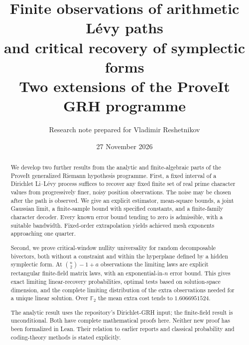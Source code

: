 \documentclass[11pt]{article}
\title{\textbf{Finite observations of arithmetic L\'evy paths\\and critical recovery of symplectic forms}\\[0.7em]
\large Two extensions of the ProveIt GRH programme}
\author{Research note prepared for Vladimir Reshetnikov}
\date{27 November 2026}
\theoremstyle{remark}
\numberwithin{equation}{section}
\begin{document}
\maketitle
\begin{abstract}
We develop two further results from the analytic and finite-algebraic parts of the ProveIt generalized Riemann hypothesis programme. First, a fixed interval of a Dirichlet Li--L\'evy process suffices to recover any fixed finite set of real prime character values from progressively finer, noisy position observations. The noise may be chosen after the path is observed. We give an explicit estimator, mean-square bounds, a joint Gaussian limit, a finite-sample bound with specified constants, and a finite-family character decoder. Every known error bound tending to zero is admissible, with a suitable bandwidth. Fixed-order extrapolation yields achieved mesh exponents approaching one quarter.

Second, we prove critical-window nullity universality for random decomposable bivectors, both without a constraint and within the hyperplane defined by a hidden symplectic form. At $\binom n2-1+a$ observations the limiting laws are explicit rectangular finite-field matrix laws, with an exponential-in-$n$ error bound. This gives exact limiting linear-recovery probabilities, optimal tests based on solution-space dimension, and the complete limiting distribution of the extra observations needed for a unique linear solution. Over $\mathbb F_2$ the mean extra cost tends to $1.6066951524$.

The analytic result uses the repository's Dirichlet-GRH input; the finite-field result is unconditional. Both have complete mathematical proofs here. Neither new proof has been formalized in Lean. Their relation to earlier reports and classical probability and coding-theory methods is stated explicitly.
\end{abstract}
\tableofcontents
\newpage





\end{document}
